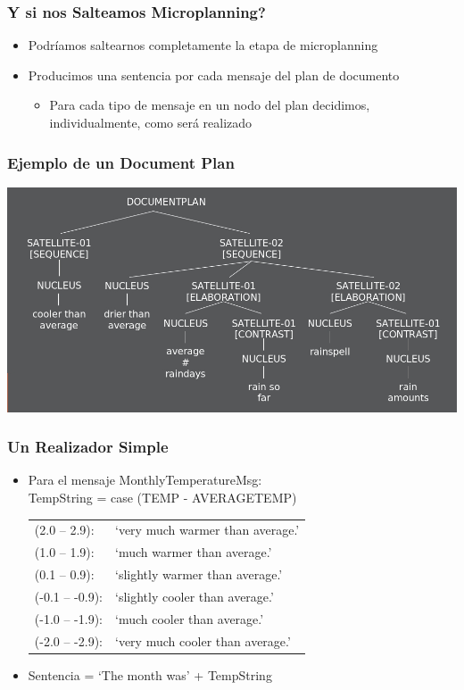 \documentclass[compress,color=usenames]{beamer}
\begin{document}
\begin{frame}
\frametitle{Y si nos Salteamos Microplanning?}

\begin{itemize}
\item Podr\'iamos saltearnos completamente la etapa de microplanning
\item Producimos una sentencia por cada mensaje del plan de documento
\begin{itemize}
\item Para cada tipo de mensaje en un nodo del plan decidimos, individualmente, como ser\'a realizado
\end{itemize}
\end{itemize}
 
\end{frame}

\begin{frame}
\frametitle{Ejemplo de un Document Plan}

\begin{center}
\includegraphics[scale=.4]{pics/pic10.jpg}
\end{center}
 
\end{frame}

\begin{frame}
\frametitle{Un Realizador Simple}

\begin{itemize}
\item { {Para el mensaje MonthlyTemperatureMsg:}}\\
{ {TempString = case (TEMP - AVERAGETEMP)}}
\ \ \ \begin{tabular}{ll}
 (2.0 -- 2.9): &`very much warmer than average.'\\
 (1.0 -- 1.9): &`much warmer than average.'\\
 (0.1 -- 0.9): &`slightly warmer than average.'\\
 (-0.1 -- -0.9): &`slightly cooler than average.'\\
 (-1.0 -- -1.9): &`much cooler than average.'\\
 (-2.0 -- -2.9): &`very much cooler than average.'
\end{tabular}

\item { {Sentencia = `The month was' + TempString}}
\end{itemize}
 
\end{frame}
\end{document}
